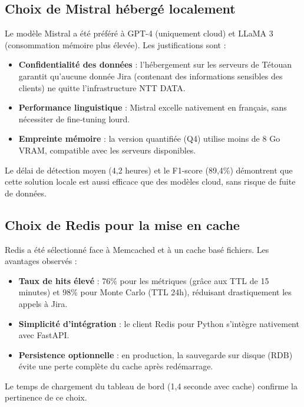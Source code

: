 \subsection{Choix de Mistral hébergé localement}
Le modèle Mistral a été préféré à GPT-4 (uniquement cloud) et LLaMA 3 (consommation mémoire plus élevée). Les justifications sont :
\begin{itemize}
    \renewcommand{\labelitemi}{—}
    \item \textbf{Confidentialité des données} : l’hébergement sur les serveurs de Tétouan garantit qu’aucune donnée Jira (contenant des informations sensibles des clients) ne quitte l’infrastructure NTT DATA.
    \item \textbf{Performance linguistique} : Mistral excelle nativement en français, sans nécessiter de fine‑tuning lourd.
    \item \textbf{Empreinte mémoire} : la version quantifiée (Q4) utilise moins de 8 Go VRAM, compatible avec les serveurs disponibles.
\end{itemize}
Le délai de détection moyen (4,2 heures) et le F1-score (89,4\%) démontrent que cette solution locale est aussi efficace que des modèles cloud, sans risque de fuite de données.

\subsection{Choix de Redis pour la mise en cache}
Redis a été sélectionné face à Memcached et à un cache basé fichiers. Les avantages observés :
\begin{itemize}
    \renewcommand{\labelitemi}{—}
    \item \textbf{Taux de hits élevé} : 76\% pour les métriques (grâce aux TTL de 15 minutes) et 98\% pour Monte Carlo (TTL 24h), réduisant drastiquement les appels à Jira.
    \item \textbf{Simplicité d’intégration} : le client Redis pour Python s’intègre nativement avec FastAPI.
    \item \textbf{Persistence optionnelle} : en production, la sauvegarde sur disque (RDB) évite une perte complète du cache après redémarrage.
\end{itemize}
Le temps de chargement du tableau de bord (1,4 seconde avec cache) confirme la pertinence de ce choix.

